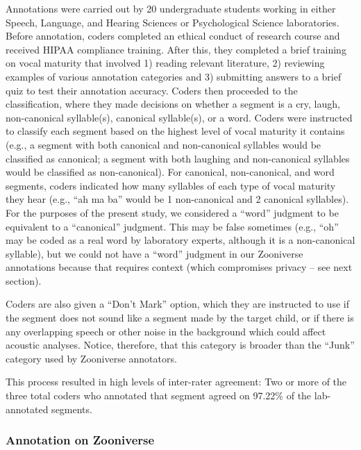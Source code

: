 \documentclass[english,,man]{apa6}
\begin{document}
Annotations were carried out by 20 undergraduate students working in either Speech, Language, and Hearing Sciences or Psychological Science laboratories. Before annotation, coders completed an ethical conduct of research course and received HIPAA compliance training. After this, they completed a brief training on vocal maturity that involved 1) reading relevant literature, 2) reviewing examples of various annotation categories and 3) submitting answers to a brief quiz to test their annotation accuracy. Coders then proceeded to the classification, where they made decisions on whether a segment is a cry, laugh, non-canonical syllable(s), canonical syllable(s), or a word. Coders were instructed to classify each segment based on the highest level of vocal maturity it contains (e.g., a segment with both canonical and non-canonical syllables would be classified as canonical; a segment with both laughing and non-canonical syllables would be classified as non-canonical). For canonical, non-canonical, and word segments, coders indicated how many syllables of each type of vocal maturity they hear (e.g., \enquote{ah ma ba} would be 1 non-canonical and 2 canonical syllables). For the purposes of the present study, we considered a \enquote{word} judgment to be equivalent to a \enquote{canonical} judgment. This may be false sometimes (e.g., \enquote{oh} may be coded as a real word by laboratory experts, although it is a non-canonical syllable), but we could not have a \enquote{word} judgment in our Zooniverse annotations because that requires context (which compromises privacy -- see next section).

Coders are also given a \enquote{Don't Mark} option, which they are instructed to use if the segment does not sound like a segment made by the target child, or if there is any overlapping speech or other noise in the background which could affect acoustic analyses. Notice, therefore, that this category is broader than the \enquote{Junk} category used by Zooniverse annotators.

This process resulted in high levels of inter-rater agreement: Two or more of the three total coders who annotated that segment agreed on 97.22\% of the lab-annotated segments.

\hypertarget{annotation-on-zooniverse}{%
\subsubsection{Annotation on Zooniverse}\label{annotation-on-zooniverse}}
\end{document}
